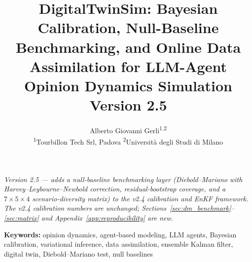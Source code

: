 \documentclass[12pt]{article}
\title{DigitalTwinSim: Bayesian Calibration, Null-Baseline Benchmarking, and Online Data Assimilation for LLM-Agent Opinion Dynamics Simulation\\[6pt]
{\large\normalfont Version 2.5}}
\author{Alberto Giovanni Gerli\textsuperscript{1,2} \\[6pt]
{\small \textsuperscript{1}Tourbillon Tech Srl, Padova \qquad
\textsuperscript{2}Universit\`a degli Studi di Milano}}
\date{}
\begin{document}
\maketitle

\begin{center}
\small\textit{Version 2.5 --- adds a null-baseline benchmarking layer (Diebold--Mariano with Harvey--Leybourne--Newbold correction, residual-bootstrap coverage, and a $7 \times 5 \times 4$ scenario-diversity matrix) to the v2.4 calibration and EnKF framework. The v2.4 calibration numbers are unchanged; Sections~\ref{sec:dm_benchmark}--\ref{sec:matrix} and Appendix~\ref{app:reproducibility} are new.}
\end{center}

\vspace{6pt}
\noindent\textbf{Keywords:} opinion dynamics, agent-based modeling, LLM agents, Bayesian calibration, variational inference, data assimilation, ensemble Kalman filter, digital twin, Diebold--Mariano test, null baselines
\end{document}
